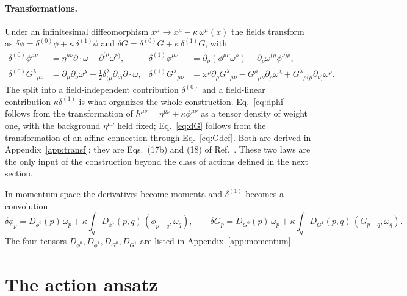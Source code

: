 \documentclass[prd,aps,preprint,nofootinbib,amsmath,amssymb,eqsecnum]{revtex4-2}
\newcommand{\ip}[1]{\int_{#1}}
\begin{document}
\paragraph{Transformations.} Under an infinitesimal diffeomorphism
$x^\mu\to x^\mu-\kappa\,\omega^\mu(x)$ the fields transform as
$\delta\phi=\delta^{(0)}\phi+\kappa\,\delta^{(1)}\phi$ and $\delta G=\delta^{(0)}G+\kappa\,\delta^{(1)}G$, with
\begin{align}
\delta^{(0)}\phi^{\mu\nu}&=\eta^{\mu\nu}\partial\!\cdot\!\omega-\partial^{(\mu}\omega^{\nu)},&
\delta^{(1)}\phi^{\mu\nu}&=\partial_\rho(\phi^{\mu\nu}\omega^\rho)-\partial_\rho\omega^{(\mu}\phi^{\nu)\rho},
\label{eq:dphi}\\
\delta^{(0)}G^{\lambda}{}_{\mu\nu}&=\partial_\mu\partial_\nu\omega^\lambda-\tfrac12\delta^{\lambda}_{(\mu}\partial_{\nu)}\partial\!\cdot\!\omega,&
\delta^{(1)}G^{\lambda}{}_{\mu\nu}&=\omega^\rho\partial_\rho G^{\lambda}{}_{\mu\nu}-G^{\rho}{}_{\mu\nu}\partial_\rho\omega^\lambda
+G^{\lambda}{}_{\rho(\mu}\partial_{\nu)}\omega^\rho.
\label{eq:dG}
\end{align}
The split into a field-independent contribution $\delta^{(0)}$ and a field-linear contribution
$\kappa\delta^{(1)}$ is what organizes the whole construction.
Eq.~\eqref{eq:dphi} follows from the transformation of $h^{\mu\nu}=\eta^{\mu\nu}+\kappa\phi^{\mu\nu}$
as a tensor density of weight one, with the background $\eta^{\mu\nu}$ held fixed;
Eq.~\eqref{eq:dG} follows from the transformation of an affine connection through
Eq.~\eqref{eq:Gdef}. Both are derived in Appendix~\ref{app:transf}; they are
Eqs.~(17b) and (18) of Ref.~\cite{BrandtMcKeon2015}. These two laws are the only input of the
construction beyond the class of actions defined in the next section.

In momentum space the derivatives become momenta and $\delta^{(1)}$ becomes a convolution:
\begin{equation}
\delta\phi_p=D_{\phi^0}(p)\,\omega_p+\kappa\ip{q}D_{\phi^1}(p,q)\,(\phi_{p-q},\omega_q),\qquad
\delta G_p=D_{G^0}(p)\,\omega_p+\kappa\ip{q}D_{G^1}(p,q)\,(G_{p-q},\omega_q).
\label{eq:dmom}
\end{equation}
The four tensors $D_{\phi^0},D_{\phi^1},D_{G^0},D_{G^1}$ are listed in Appendix~\ref{app:momentum}.

\section{The action ansatz}
\label{sec:ansatz}
\end{document}
